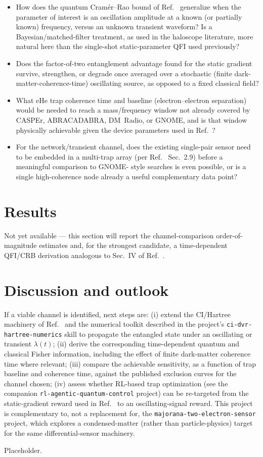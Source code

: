 \documentclass[aps,prxquantum,reprint,superscriptaddress,longbibliography]{revtex4-2}
\begin{document}
\begin{itemize}
  \item How does the quantum Cram\'er--Rao bound of Ref.~\cite{perruzza2026} generalize when the
  parameter of interest is an oscillation amplitude at a known (or partially known) frequency, versus
  an unknown transient waveform? Is a Bayesian/matched-filter treatment, as used in the haloscope
  literature, more natural here than the single-shot static-parameter QFI used previously?
  \item Does the factor-of-two entanglement advantage found for the static gradient survive, strengthen,
  or degrade once averaged over a stochastic (finite dark-matter-coherence-time) oscillating source,
  as opposed to a fixed classical field?
  \item What eHe trap coherence time and baseline (electron--electron separation) would be needed to
  reach a mass/frequency window not already covered by CASPEr, ABRACADABRA, DM~Radio, or GNOME, and is
  that window physically achievable given the device parameters used in
  Ref.~\cite{beysengulov2024,perruzza2026}?
  \item For the network/transient channel, does the existing single-pair sensor need to be embedded in
  a multi-trap array (per Ref.~\cite{perruzza2026} Sec.~2.9) before a meaningful comparison to GNOME-
  style searches is even possible, or is a single high-coherence node already a useful complementary
  data point?
\end{itemize}

\section{Results}

Not yet available — this section will report the channel-comparison order-of-magnitude estimates and,
for the strongest candidate, a time-dependent QFI/CRB derivation analogous to Sec.~IV of
Ref.~\cite{perruzza2026}.

\section{Discussion and outlook}

If a viable channel is identified, next steps are: (i) extend the CI/Hartree machinery of
Ref.~\cite{beysengulov2024} and the numerical toolkit described in the project's
\texttt{ci-dvr-hartree-numerics} skill to propagate the entangled state under an oscillating or
transient $\lambda(t)$; (ii) derive the corresponding time-dependent quantum and classical Fisher
information, including the effect of finite dark-matter coherence time where relevant; (iii) compare
the achievable sensitivity, as a function of trap baseline and coherence time, against the published
exclusion curves for the channel chosen; (iv) assess whether RL-based trap optimization (see the
companion \texttt{rl-agentic-quantum-control} project) can be re-targeted from the static-gradient
reward used in Ref.~\cite{perruzza2026} to an oscillating-signal reward. This project is
complementary to, not a replacement for, the \texttt{majorana-two-electron-sensor} project, which
explores a condensed-matter (rather than particle-physics) target for the same differential-sensor
machinery.

\begin{acknowledgments}
Placeholder.
\end{acknowledgments}


\end{document}
